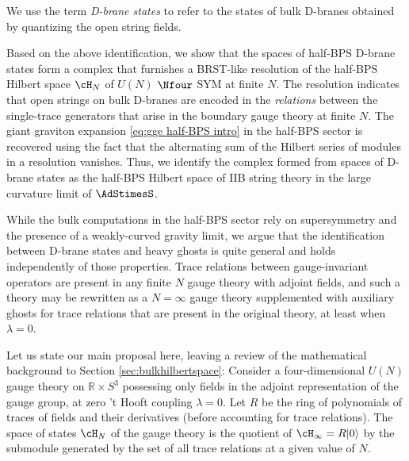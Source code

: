 \documentclass[a4paper,12pt]{article}
\begin{document}
We use the term \textit{D-brane states} to refer to the states of bulk D-branes obtained by quantizing the open string fields.

Based on the above identification, we show that the spaces of half-BPS D-brane states form a complex that furnishes a BRST-like resolution of the half-BPS Hilbert space $\cH_N$ of $U(N)$ $\Nfour$ SYM at finite $N$. The resolution indicates that open strings on bulk D-branes are encoded in the \textit{relations} between the single-trace generators that arise in the boundary gauge theory at finite $N$. The giant graviton expansion \eqref{eq:gge half-BPS intro} in the half-BPS sector is recovered using the fact that the alternating sum of the Hilbert series of modules in a resolution vanishes. Thus, we identify the complex formed from spaces of D-brane states as the half-BPS Hilbert space of IIB string theory in the large curvature limit of $\AdStimesS$.

While the bulk computations in the half-BPS sector rely on supersymmetry and the presence of a weakly-curved gravity limit, we argue that the identification between D-brane states and heavy ghosts is quite general and holds independently of those properties. Trace relations between gauge-invariant operators are present in any finite $N$ gauge theory with adjoint fields, and such a theory may be rewritten as a $N=\infty$ gauge theory supplemented with auxiliary ghosts for trace relations that are present in the original theory, at least when $\lambda = 0$.

Let us state our main proposal here, leaving a review of the mathematical background to Section \ref{sec:bulkhilbertspace}: Consider a four-dimensional $U(N)$ gauge theory on $\mathbb{R} \times S^3$ possessing only fields in the adjoint representation of the gauge group, at zero 't Hooft coupling $\lambda = 0$. Let $R$ be the ring of polynomials of traces of fields and their derivatives (before accounting for trace relations). The space of states $\cH_N$ of the gauge theory is the quotient of $\cH_\infty = R |0\rangle$ by the submodule generated by the set of all trace relations at a given value of $N$.
\end{document}
